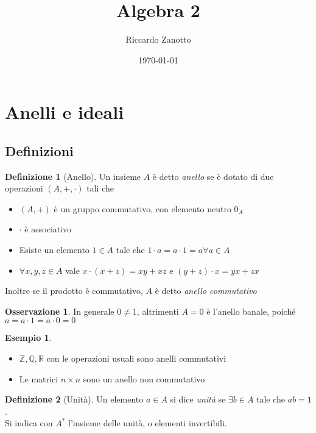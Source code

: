 \documentclass[a4paper,10pt]{article}
\title{Algebra 2}
\author{Riccardo Zanotto}
\date{\today}
\theoremstyle{plain}
\theoremstyle{definition}
\newtheorem{defn}{Definizione}[section]
\newtheorem*{exmp}{Esempio}
\newtheorem*{oss}{Osservazione}
\newcommand{\Z}{\mathbb{Z}}
\newcommand{\Q}{\mathbb{Q}}
\newcommand{\R}{\mathbb{R}}
\begin{document}
\maketitle
\tableofcontents
\newpage

\section{Anelli e ideali}

\subsection{Definizioni}

\begin{defn}[Anello]
    Un insieme $A$ è detto \textit{anello} se è dotato di due operazioni $(A,+,\cdot)$ tali che
    \begin{itemize}
        \item $(A,+)$ è un gruppo commutativo, con elemento neutro $0_A$
        \item $\cdot$ è associativo
        \item Esiste un elemento $1\in A$ tale che $1\cdot a=a\cdot1=a\forall a\in A$
        \item $\forall x,y,z\in A$ vale $x\cdot(x+z)=xy+xz$ e $(y+z)\cdot x=yx+zx$
    \end{itemize}
    Inoltre se il prodotto è commutativo, $A$ è detto \textit{anello commutativo}
\end{defn}

\begin{oss}
    In generale $0\neq1$, altrimenti $A={0}$ è l'anello banale, poiché $a=a\cdot1=a\cdot0=0$
\end{oss}

\begin{exmp}
    $ $
    \begin{itemize}
        \item $\Z,\Q,\R$ con le operazioni usuali sono anelli commutativi
        \item Le matrici $n\times n$ sono un anello non commutativo
    \end{itemize}
\end{exmp}

\begin{defn}[Unità]
    Un elemento $a\in A$ si dice \textit{unità} se $\exists b\in A$ tale che $ab=1$.\\
    Si indica con $A^\ast$ l'insieme delle unità, o elementi invertibili.
\end{defn}
\end{document}
